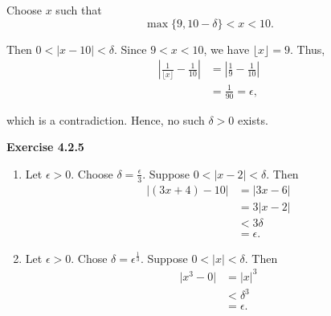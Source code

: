 \documentclass[12pt]{article}
\begin{document}
\begin{enumerate}[label=(\alph*)]
          Choose \(x\) such that
          \[
              \max\{9,10-\delta\}<x<10.
          \]

          Then \(0<|x-10|<\delta\). Since \(9<x<10\), we have \(\lfloor x\rfloor=9\). Thus,
          \[
              \begin{aligned}
                  \left|\frac{1}{\lfloor x\rfloor}-\frac{1}{10}\right|
                   & =\left|\frac19-\frac1{10}\right| \\
                   & =\frac1{90}=\epsilon,
              \end{aligned}
          \]

          which is a contradiction. Hence, no such \(\delta>0\) exists.
\end{enumerate}

\textbf{Exercise 4.2.5}
\begin{enumerate}[label=(\alph*)]
    \item Let \( \epsilon > 0 \). Choose \( \delta = \frac{\epsilon}{3} \). Suppose \( 0 < \vert x - 2 \vert < \delta \). Then
          \[
              \begin{split}
                  \vert (3x+4) - 10 \vert & = | 3x - 6 |         \\
                                          & = 3\vert x - 2 \vert \\
                                          & < 3 \delta           \\
                                          & = \epsilon.
              \end{split}
          \]
    \item Let \( \epsilon > 0 \). Chose \( \delta = \epsilon^{\frac{1}{3}} \). Suppose \( 0 < \vert x \vert < \delta  \). Then
          \[
              \begin{split}
                  \vert x^3 - 0 \vert & = \vert x \vert^3 \\
                                      & < \delta ^3       \\
                                      & = \epsilon.
              \end{split}
          \]


\end{enumerate}
\end{document}
